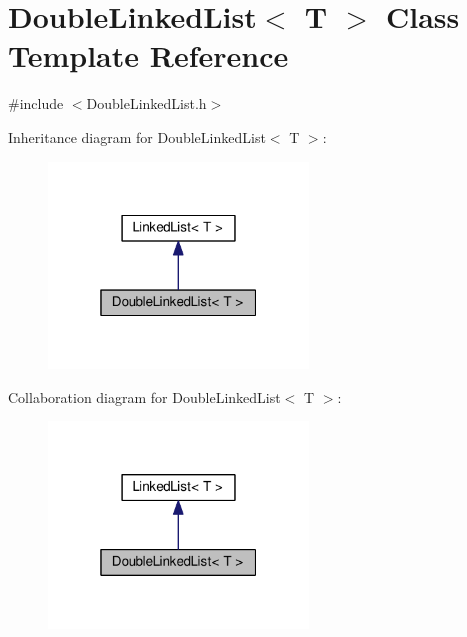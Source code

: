\hypertarget{classDoubleLinkedList}{}\section{Double\+Linked\+List$<$ T $>$ Class Template Reference}
\label{classDoubleLinkedList}


{\ttfamily \#include $<$Double\+Linked\+List.\+h$>$}



Inheritance diagram for Double\+Linked\+List$<$ T $>$\+:
\nopagebreak
\begin{figure}[H]
\begin{center}
\leavevmode
\includegraphics[width=196pt]{classDoubleLinkedList__inherit__graph}
\end{center}
\end{figure}


Collaboration diagram for Double\+Linked\+List$<$ T $>$\+:
\nopagebreak
\begin{figure}[H]
\begin{center}
\leavevmode
\includegraphics[width=196pt]{classDoubleLinkedList__coll__graph}
\end{center}
\end{figure}
